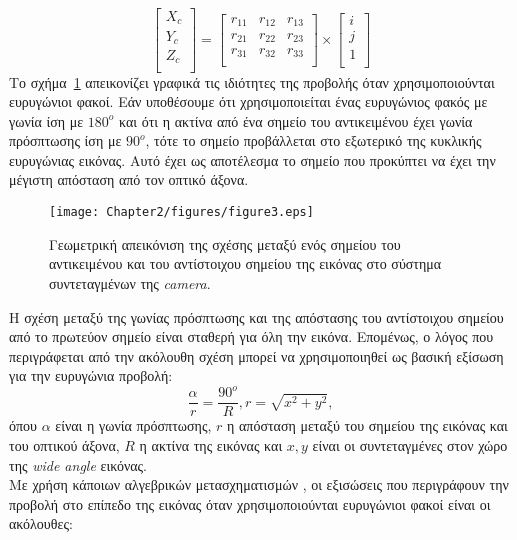 \[
\begin{bmatrix}
X_{c} \\
Y_{c} \\
Z_{c} \\
\end{bmatrix}
=
\begin{bmatrix}
r_{11} & r_{12} & r_{13} \\
r_{21} & r_{22} & r_{23} \\
r_{31} & r_{32} & r_{33} \\
\end{bmatrix}
\times
\begin{bmatrix}
i \\
j \\
1 \\
\end{bmatrix}
\]
\noindent
Το σχήμα~\ref{figure:fig23} απεικονίζει γραφικά τις ιδιότητες της προβολής όταν χρησιμοποιούνται ευρυγώνιοι φακοί. Εάν υποθέσουμε ότι χρησιμοποιείται ένας ευρυγώνιος φακός με γωνία ίση με \(180^{o}\) και ότι η ακτίνα από ένα σημείο του αντικειμένου έχει γωνία πρόσπτωσης ίση με \(90^{o}\), τότε το σημείο προβάλλεται στο εξωτερικό της κυκλικής ευρυγώνιας εικόνας. Αυτό έχει ως αποτέλεσμα το σημείο που προκύπτει να έχει την μέγιστη απόσταση από τον οπτικό άξονα.
\begin{figure}
\centering
\texttt{[image: Chapter2/figures/figure3.eps]}
\caption{Γεωμετρική απεικόνιση της σχέσης μεταξύ ενός σημείου του αντικειμένου και του αντίστοιχου σημείου της εικόνας στο σύστημα συντεταγμένων της \textsl{camera}.}
\label{figure:fig23}
\end{figure}
Η σχέση μεταξύ της γωνίας πρόσπτωσης και της απόστασης του αντίστοιχου σημείου από το πρωτεύον σημείο είναι σταθερή για όλη την εικόνα. Επομένως, ο λόγος που περιγράφεται από την ακόλουθη σχέση μπορεί να χρησιμοποιηθεί ως βασική εξίσωση για την ευρυγώνια προβολή:
\begin{equation}
\label{equation:eqtn21}
\frac{\alpha}{r}=\frac{90^{o}}{R}, r = \sqrt{x^{2} + y^{2}},
\end{equation}
\noindent
όπου \(\alpha\) είναι η γωνία πρόσπτωσης, \(r\) η απόσταση μεταξύ του σημείου της εικόνας και του οπτικού άξονα, \(R\) η ακτίνα της εικόνας και \(x, y\) είναι οι συντεταγμένες στον χώρο της \textsl{wide angle} εικόνας.\\
\indent
Με χρήση κάποιων αλγεβρικών μετασχηματισμών \cite{Schwalbe05}, οι εξισώσεις που περιγράφουν την προβολή στο επίπεδο της εικόνας όταν χρησιμοποιούνται ευρυγώνιοι φακοί είναι οι ακόλουθες:


